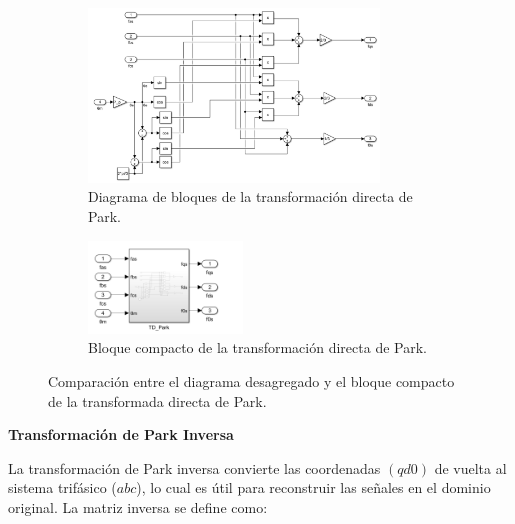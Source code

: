 \documentclass{article}
\begin{document}
\begin{figure}[H]
    \centering
    \begin{subfigure}[t]{\textwidth}
        \centering
        \includegraphics[width=0.85\textwidth]{Imagenes/ParkDirecta.png}
        \caption{Diagrama de bloques de la transformación directa de Park.}
        \label{fig:bloques_park_directa_desagregado}
    \end{subfigure}
    
    \vspace{0.5cm} %
    
    \begin{subfigure}[t]{\textwidth}
        \centering
        \includegraphics[width=0.45\textwidth]{Imagenes/CompactoParkDirecta.png}
        \caption{Bloque compacto de la transformación directa de Park.}
        \label{fig:bloque_park_directa_compacto}
    \end{subfigure}
    
    \caption{Comparación entre el diagrama desagregado y el bloque compacto de la transformada directa de Park.}
    \label{fig:bloques_park_directa}
\end{figure}

\textbf{Transformación de Park Inversa}

La transformación de Park inversa convierte las coordenadas \((qd0)\) de vuelta al sistema trifásico (\(abc\)), lo cual es útil para reconstruir las señales en el dominio original. La matriz inversa se define como:
\end{document}
